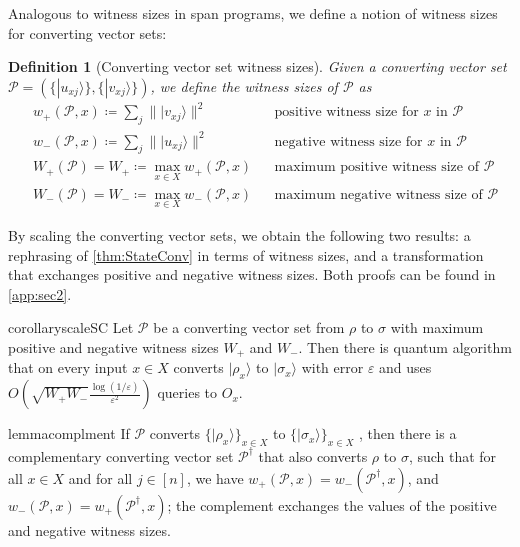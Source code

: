 \documentclass[cleveref, autoref, thm-restate,11pt]{article}
\newtheorem{definition}[theorem]{Definition}
\theoremstyle{definition}
\newcommand{\ket}[1]{|#1\rangle}
\renewcommand{\wp}[2]{{w_+({#1},{#2})}}
\newcommand{\wm}[2]{{w_-({#1},{#2})}}
\begin{document}
 
Analogous to witness sizes in span
programs, we define a notion of witness sizes for converting vector sets:
\begin{definition} [Converting vector set witness sizes]
Given a converting vector set
$\mathscr{P}=\left(\{\ket{u_{xj}}\},\{\ket{v_{xj}}\}\right)$, we define the
witness sizes of $\mathscr P$  as
\begin{align}
&\wp{\mathscr P}{x}\coloneqq\sum_j\|\ket{v_{xj}}\|^2 & &\textrm{positive witness size for $x$ in $\mathscr P$}\nonumber\\
&\wm{\mathscr P}{x}\coloneqq\sum_j\|\ket{u_{xj}}\|^2 & &\textrm{negative witness size for $x$ in $\mathscr P$}\nonumber\\
&W_+(\mathscr P)=W_+\coloneqq\max_{x\in X}\wp{\mathscr P}{x}& &\textrm{maximum positive witness size of $\mathscr P$}\nonumber\\
&W_-(\mathscr P)=W_-\coloneqq\max_{x\in X}\wm{\mathscr P}{x}& &\textrm{maximum negative witness size of $\mathscr P$}
\end{align}
\end{definition}

By scaling the converting vector sets, we obtain the following two results: a rephrasing of \cref{thm:StateConv} in terms of witness sizes, and a transformation that exchanges positive and negative witness sizes. Both proofs can be found in \cref{app:sec2}.
\begin{restatable}{corollary}{scaleSC}\label{cor:stateConv}
Let $\mathscr{P}$ be a converting
vector set from $\rho$ to $\sigma$ with maximum positive and negative witness sizes $W_+$ and $W_-$. 
Then there is quantum algorithm that on every input $x\in X$ converts 
$\ket{\rho_x}$ to $\ket{\sigma_x}$ with error $\varepsilon$ and uses
$O\left(\sqrt{W_+W_-}\frac{\log(1/\varepsilon)}{\varepsilon^2}\right)$ queries to $O_x$.
\end{restatable}


\begin{restatable}{lemma}{complment}\label{lem:complement}
If $\mathscr{P}$ converts $\{\ket{\rho_x}\}_{x\in X}$ to 
$\{\ket{\sigma_x}\}_{x\in X}$ , then there is a complementary
converting vector set $\mathscr P^\dagger$ that also converts $\rho$ to $\sigma$, 
such that for all $x\in X$ and for all $j\in [n]$, we have 
$w_+(\mathscr P,x)=w_-(\mathscr P^\dagger,x)$, and 
$w_-(\mathscr P,x)=w_+(\mathscr P^\dagger,x)$; the 
complement exchanges the values of the positive and negative witness sizes.
\end{restatable}
\end{document}
